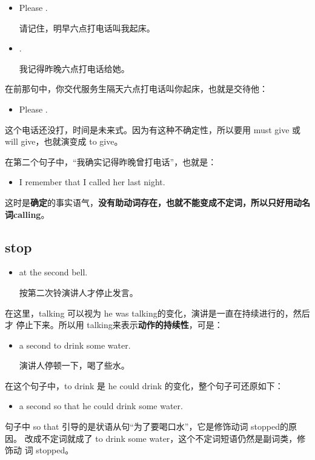 \begin{itemize}
\item Please  .

  请记住，明早六点打电话叫我起床。
\item {}  .

  我记得昨晚六点打电话给她。
\end{itemize}

在前那句中，你交代服务生隔天六点打电话叫你起床，也就是交待他：
\begin{itemize}
\item  Please  .
\end{itemize}
这个电话还没打，时间是未来式。因为有这种不确定性，所以要用 must give 或
will give，也就演变成 to give。

在第二个句子中，“我确实记得昨晚曾打电话”，也就是：
\begin{itemize}
\item  I remember that I called her last night.
\end{itemize}
这时是\textbf{确定}的事实语气，\textbf{没有助动词存在，也就不能变成不定词，所以只好用动名
  词calling}。

\subsection{stop}

\begin{itemize}
\item {}   at the second bell.

  按第二次铃演讲人才停止发言。
\end{itemize}
在这里，talking 可以视为 he was talking的变化，演讲是一直在持续进行的，然后才
停止下来。所以用 talking来表示\textbf{动作的持续性}，可是：

\begin{itemize}
\item {}  a second to drink some water.

演讲人停顿一下，喝了些水。
\end{itemize}
在这个句子中，to drink 是 he could drink 的变化，整个句子可还原如下：
\begin{itemize}
\item {}  a second so that he could drink some water.
\end{itemize}
句子中 so that 引导的是状语从句“为了要喝口水”，它是修饰动词 stopped的原因。
改成不定词就成了 to drink some water，这个不定词短语仍然是副词类，修饰动
词 stopped。

